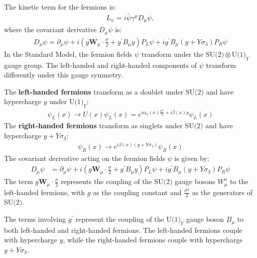 \begin{enumerate}
The kinetic term for the fermions is:
\begin{align}
    L_{\psi} = i \bar{\psi} \gamma^\mu D_\mu \psi,\label{eq:L-psi-def}
\end{align}
where the covariant derivative $D_\mu \psi$ is:
\begin{align}
    D_\mu \psi = \partial_\mu \psi + i \left( g \mathbf{W}_\mu \cdot \frac{\sigma}{2} + g^\prime B_\mu y \right) P_L \psi + i g^\prime B_\mu (y + Y \sigma_3) P_R \psi
\end{align}
In the Standard Model, the fermion fields $\psi$ transform under the $\text{SU(2)} \otimes \text{U(1)}_Y$ gauge group. The left-handed and right-handed components of $\psi$ transform differently under this gauge symmetry.

The \textbf{left-handed fermions} transform as a doublet under $\text{SU(2)}$ and have hypercharge $y$ under $\text{U(1)}_Y$:
\begin{align}
    \psi_L(x) \to U(x) \psi_L(x) = e^{\displaystyle i \alpha_a(x) \frac{\sigma^a}{2} + i \beta(x) y} \psi_L(x)
\end{align}
The \textbf{right-handed fermions} transform as singlets under $\text{SU(2)}$ and have hypercharge $y + Y \sigma_3$:
\begin{align}
    \psi_R(x) \to e^{\displaystyle i \beta(x) (y + Y \sigma_3)} \psi_R(x)
\end{align}
The covariant derivative acting on the fermion fields $\psi$ is given by:
\begin{align}
    D_\mu \psi &= \partial_\mu \psi + i \left( g \mathbf{W}_\mu \cdot \frac{\sigma}{2} + g^\prime B_\mu y \right) P_L \psi + i g^\prime B_\mu (y + Y \sigma_3) P_R \psi
\end{align}
The term $\displaystyle g \mathbf{W}_\mu \cdot \frac{\sigma}{2}$ represents the coupling of the $\text{SU(2)}$ gauge bosons $W_\mu^a$ to the left-handed fermions, with $g$ as the coupling constant and $\displaystyle\frac{\sigma^a}{2}$ as the generators of $\text{SU(2)}$.

The terms involving $g^\prime $ represent the coupling of the $\text{U(1)}_Y$ gauge boson $B_\mu$ to both left-handed and right-handed fermions. The left-handed fermions couple with hypercharge $y$, while the right-handed fermions couple with hypercharge $y + Y \sigma_3$.


\end{enumerate}
